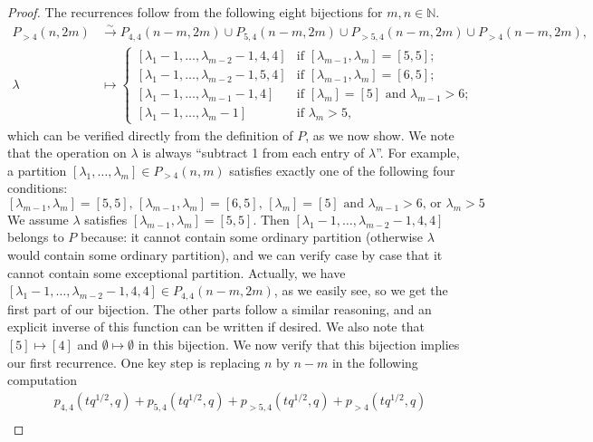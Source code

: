 \documentclass[a4paper, 12pt, reqno]{amsart}
\theoremstyle{remark}
\begin{document}
\begin{proof}
  The recurrences follow from the following eight bijections for $m, n \in \mathbb{N}$.
  \begin{align*}
    P_{>4}(n, 2m) &\xrightarrow{\sim} P_{4, 4}(n - m, 2m) \cup P_{5, 4}(n - m, 2m) \cup P_{>5, 4}(n - m, 2m) \cup P_{>4}(n - m, 2m), \\
    \lambda &\mapsto
              \begin{cases}
                [\lambda_1 - 1, \dots, \lambda_{m - 2} - 1, 4, 4] &\text{if $[\lambda_{m - 1}, \lambda_m] = [5, 5]$}; \\
                [\lambda_1 - 1, \dots, \lambda_{m - 2} - 1, 5, 4] &\text{if $[\lambda_{m - 1}, \lambda_m] = [6, 5]$}; \\
                [\lambda_1 - 1, \dots, \lambda_{m - 1} - 1, 4] &\text{if $[\lambda_m] = [5]$ and $\lambda_{m - 1} > 6$}; \\
                [\lambda_1 - 1, \dots, \lambda_m - 1] &\text{if $\lambda_m > 5$},
              \end{cases}
  \end{align*}
  which can be verified directly from the definition of $P$, as we now show.
  We note that the operation on $\lambda$ is always ``subtract 1 from each entry of $\lambda$''.
  For example, a partition $[\lambda_1, \dots, \lambda_m] \in P_{>4}(n, m)$ satisfies exactly one of the following four conditions:
  \begin{equation*}
    \text{$[\lambda_{m - 1}, \lambda_m] = [5, 5]$, $[\lambda_{m - 1}, \lambda_m] = [6, 5]$, $[\lambda_m] = [5]$ and $\lambda_{m - 1} > 6$, or $\lambda_m > 5$}.
  \end{equation*}
  We assume $\lambda$ satisfies $[\lambda_{m - 1}, \lambda_m] = [5, 5]$.
  Then $[\lambda_1 - 1, \dots, \lambda_{m - 2} - 1, 4, 4]$ belongs to $P$ because: it cannot contain some ordinary partition (otherwise $\lambda$ would contain some ordinary partition), and we can verify case by case that it cannot contain some exceptional partition.
  Actually, we have $[\lambda_1 - 1, \dots, \lambda_{m - 2} - 1, 4, 4] \in P_{4, 4}(n - m, 2m)$, as we easily see, so we get the first part of our bijection.
  The other parts follow a similar reasoning, and an explicit inverse of this function can be written if desired.
  We also note that $[5] \mapsto [4]$ and $\emptyset \mapsto \emptyset$ in this bijection.
  We now verify that this bijection implies our first recurrence.
  One key step is replacing $n$ by $n - m$ in the following computation
  \begin{align*}
    &p_{4, 4}(tq^{1/2}, q) + p_{5, 4}(tq^{1/2}, q) + p_{>5, 4}(tq^{1/2}, q) + p_{>4}(tq^{1/2}, q) \\

\end{align*}
\end{proof}
\end{document}
